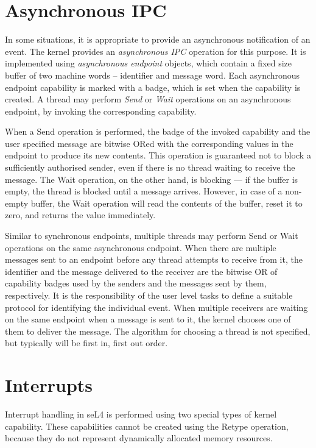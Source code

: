 \section[async-ipc]{Asynchronous IPC}

In some situations, it is appropriate to provide an asynchronous notification
of an event. The kernel provides an \emph{asynchronous IPC} operation for this
purpose. It is implemented using \emph{asynchronous endpoint} objects, which
contain a fixed size buffer of two machine words -- identifier and message word. 
Each asynchronous endpoint capability is marked with a badge, which is set when
the capability is created. A thread may perform \emph{Send} or \emph{Wait}
operations on an asynchronous endpoint, by invoking the corresponding
capability. 

When a Send operation is performed, the badge of the invoked capability and the
user specified message are bitwise ORed with the corresponding values in the
endpoint to produce its new contents. This operation is guaranteed not to block
a sufficiently authorised sender, even if there is no thread waiting to receive
the message. The Wait operation, on the other hand, is blocking --- if the
buffer is empty, the thread is blocked until a message arrives. However, in
case of a non-empty buffer, the Wait operation will read the contents of the
buffer, reset it to zero, and returns the value immediately. 

Similar to synchronous endpoints, multiple threads may perform Send or Wait
operations on the same asynchronous endpoint. When there are multiple messages
sent to an endpoint before any thread attempts to receive from it, the
identifier and the message delivered to the receiver are the bitwise OR of
capability badges used by the senders and the messages sent by them,
respectively. It is the responsibility of the user level tasks to define a
suitable protocol for identifying the individual event. When multiple receivers
are waiting on the same endpoint when a message is sent to it, the kernel
chooses one of them to deliver the message. The algorithm for choosing a thread
is not specified, but typically will be first in, first out order.

\section[interrupts]{Interrupts}

Interrupt handling in seL4 is performed using two special types of kernel 
capability. These capabilities cannot be created using the Retype operation,
because they do not represent dynamically allocated memory resources.


